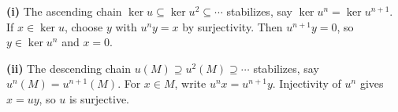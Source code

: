 \textbf{(i)} The ascending chain $\ker u\subseteq\ker u^2\subseteq\cdots$ stabilizes, say $\ker u^n=\ker u^{n+1}$. If $x\in\ker u$, choose $y$ with $u^ny=x$ by surjectivity. Then $u^{n+1}y=0$, so $y\in\ker u^n$ and $x=0$.

\textbf{(ii)} The descending chain $u(M)\supseteq u^2(M)\supseteq\cdots$ stabilizes, say $u^n(M)=u^{n+1}(M)$. For $x\in M$, write $u^nx=u^{n+1}y$. Injectivity of $u^n$ gives $x=uy$, so $u$ is surjective.

